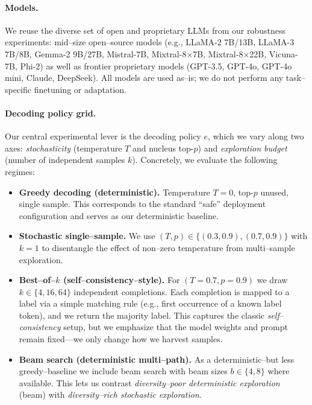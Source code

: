 \paragraph{Models.}
We reuse the diverse set of open and proprietary LLMs from our robustness
experiments: mid--size open--source models (e.g., LLaMA-2 7B/13B, LLaMA-3 7B/8B,
Gemma-2 9B/27B, Mistral-7B, Mixtral-8$\times$7B, Mixtral-8$\times$22B,
Vicuna-7B, Phi-2) as well as frontier proprietary models (GPT-3.5, GPT-4o,
GPT-4o mini, Claude, DeepSeek). All models are used as--is; we do not perform
any task--specific finetuning or adaptation.

\paragraph{Decoding policy grid.}
Our central experimental lever is the decoding policy $e$, which we vary along
two axes: \emph{stochasticity} (temperature $T$ and nucleus top-$p$) and
\emph{exploration budget} (number of independent samples $k$). Concretely, we
evaluate the following regimes:
\begin{itemize}
  \item \textbf{Greedy decoding (deterministic).}
        Temperature $T{=}0$, top-$p$ unused, single sample. This corresponds to
        the standard ``safe'' deployment configuration and serves as our
        deterministic baseline.
  \item \textbf{Stochastic single--sample.}
        We use $(T, p)\in\{(0.3,0.9), (0.7,0.9)\}$ with $k{=}1$ to disentangle
        the effect of non--zero temperature from multi--sample exploration.
  \item \textbf{Best--of--$k$ (self--consistency--style).}
        For $(T{=}0.7, p{=}0.9)$ we draw $k\in\{4,16,64\}$ independent
        completions. Each completion is mapped to a label via a simple
        matching rule (e.g., first occurrence of a known label token), and we
        return the majority label. This captures the classic
        \emph{self--consistency} setup, but we emphasize that the model weights
        and prompt remain fixed---we only change how we harvest samples.
  \item \textbf{Beam search (deterministic multi--path).}
        As a deterministic--but less greedy--baseline we include beam search
        with beam sizes $b\in\{4,8\}$ where available. This lets us contrast
        \emph{diversity--poor deterministic exploration} (beam) with
        \emph{diversity--rich stochastic exploration}.
\end{itemize}



